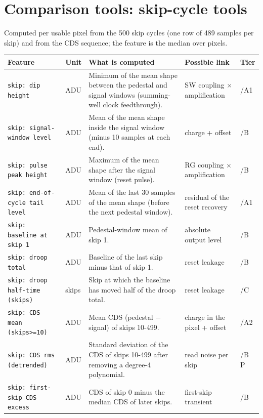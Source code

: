 \documentclass[10pt]{article}
\renewcommand{\_}{\oldunderscore\allowbreak}
\begin{document}
\section{Comparison tools: skip-cycle tools}
Computed per usable pixel from the 500 skip cycles (one row of 489 samples per skip) and from the CDS sequence; the feature is the median over pixels.

\begin{longtable}{>{\raggedright\arraybackslash}p{}>{\raggedright\arraybackslash}p{}>{\raggedright\arraybackslash}p{}>{\raggedright\arraybackslash}p{}>{\raggedright\arraybackslash}p{}}
\toprule Feature & Unit & What is computed & Possible link & Tier \\ \midrule \endhead
\bottomrule \endfoot
\texttt{skip: dip height} & ADU & Minimum of the mean shape between the pedestal and signal windows (summing-well clock feedthrough). & SW coupling $\times$ amplification & 0/A1 \\
\texttt{skip: signal-window level} & ADU & Mean of the mean shape inside the signal window (minus 10 samples at each end). & charge + offset & 0/B \\
\texttt{skip: pulse peak height} & ADU & Maximum of the mean shape after the signal window (reset pulse). & RG coupling $\times$ amplification & 0/B \\
\texttt{skip: end-of-cycle tail level} & ADU & Mean of the last 30 samples of the mean shape (before the next pedestal window). & residual of the reset recovery & 0/A1 \\
\texttt{skip: baseline at skip 1} & ADU & Pedestal-window mean of skip 1. & absolute output level & 0/B \\
\texttt{skip: droop total} & ADU & Baseline of the last skip minus that of skip 1. & reset leakage & 0/B \\
\texttt{skip: droop half-time (skips)} & skips & Skip at which the baseline has moved half of the droop total. & reset leakage & 0/C \\
\texttt{skip: CDS mean (skips\textgreater{}=10)} & ADU & Mean CDS (pedestal $-$ signal) of skips 10-499. & charge in the pixel + offset & 0/A2 \\
\texttt{skip: CDS rms (detrended)} & ADU & Standard deviation of the CDS of skips 10-499 after removing a degree-4 polynomial. & read noise per skip & 0/B P \\
\texttt{skip: first-skip CDS excess} & ADU & CDS of skip 0 minus the median CDS of later skips. & first-skip transient & 0/B \\

\end{longtable}
\end{document}
